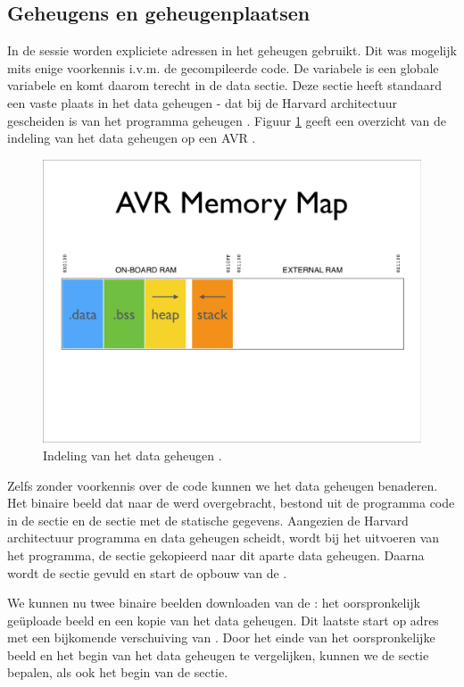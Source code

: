 \subsection{Geheugens en geheugenplaatsen}

In de  sessie worden expliciete adressen in het geheugen gebruikt. Dit
was mogelijk mits enige voorkennis i.v.m. de gecompileerde code. De
 variabele is een globale variabele en komt daarom terecht in de
 data sectie. Deze sectie heeft standaard een vaste plaats in het
data geheugen - dat bij de Harvard architectuur gescheiden is van het programma
geheugen \citep{avr-memory}. Figuur \ref{fig:avr-ram-map} geeft een overzicht
van de indeling van het data geheugen op een AVR \mcu.

\begin{figure}[ht]
  \centering
  \includegraphics[width=0.9\linewidth]{resources/avr-ram-map.pdf}
  \caption{Indeling van het data geheugen \citep{avr-malloc}.}
  \label{fig:avr-ram-map}
\end{figure}

Zelfs zonder voorkennis over de code kunnen we het data geheugen benaderen. Het
binaire beeld dat naar de \mcu werd overgebracht, bestond uit de programma code
in de  sectie en de  sectie met de statische gegevens.
Aangezien de Harvard architectuur programma en data geheugen scheidt, wordt bij
het uitvoeren van het programma, de  sectie gekopieerd naar dit
aparte data geheugen. Daarna wordt de  sectie gevuld en start de
opbouw van de .

We kunnen nu twee binaire beelden downloaden van de \mcu: het oorspronkelijk
ge\"uploade beeld en een kopie van het data geheugen. Dit laatste start op
adres  met een bijkomende verschuiving van . Door het
einde van het oorspronkelijke beeld en het begin van het data geheugen te
vergelijken, kunnen we de  sectie bepalen, als ook het begin van de
 sectie.

